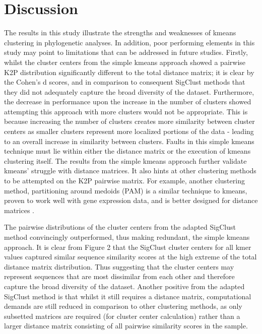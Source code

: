 \documentclass[12pt]{article}
\begin{document}
  \section{Discussion}

  The results in this study illustrate the strengths and weaknesses of kmeans clustering in phylogenetic analyses. In addition, poor performing elements in this study may point to limitations that can be addressed in future studies. Firstly, whilst the cluster centers from the simple kmeans approach showed a pairwise K2P distribution significantly different to the total distance matrix; it is clear by the Cohen's d scores, and in comparison to consequent SigClust methods that they did not adequately capture the broad diversity of the dataset. Furthermore, the decrease in performance upon the increase in the number of clusters showed attempting this approach with more clusters would not be appropriate. This is because increasing the number of clusters creates more similarity between cluster centers as smaller clusters represent more localized portions of the data - leading to an overall increase in similarity between clusters. Faults in this simple kmeans technique must lie within either the distance matrix or the execution of kmeans clustering itself. The results from the simple kmeans approach further validate kmeans' struggle with distance matrices. It also hints at other clustering methods to be attempted on the K2P pairwise matrix. For example, another clustering method, partitioning around medoids (PAM) is a similar technique to kmeans, proven to work well with gene expression data, and is better designed for distance matrices \cite{Huang2006}.

  The pairwise distributions of the cluster centers from the adapted SigClust method convincingly outperformed, thus making redundant, the simple kmeans approach. It is clear from Figure 2 that the SigClust cluster centers for all kmer values captured similar sequence similarity scores at the high extreme of the total distance matrix distribution. Thus suggesting that the cluster centers may represent sequences that are most dissimilar from each other and therefore capture the broad diversity of the dataset. Another positive from the adapted SigClust method is that whilst it still requires a distance matrix, computational demands are still reduced in comparison to other clustering methods, as only subsetted matrices are required (for cluster center calculation) rather than a larger distance matrix consisting of all pairwise similarity scores in the sample.
  
\end{document}
